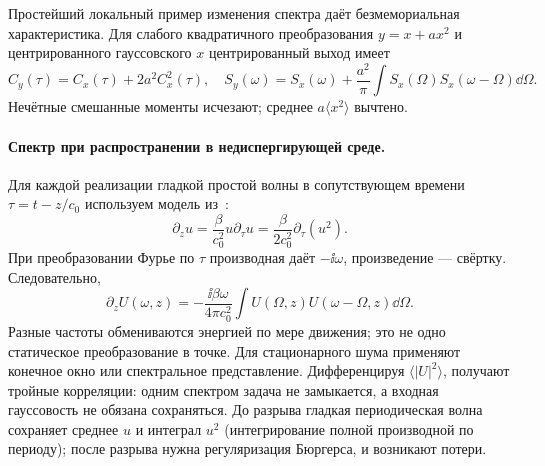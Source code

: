 Простейший локальный пример изменения спектра даёт безмемориальная характеристика. Для слабого квадратичного преобразования $y=x+ax^2$ и центрированного гауссовского $x$ центрированный выход имеет
\begin{equation}
 C_y(\tau)=C_x(\tau)+2a^2C_x^2(\tau),\quad
 S_y(\omega)=S_x(\omega)+\frac{a^2}{\pi}\int S_x(\Omega)S_x(\omega-\Omega)\dd\Omega.
\end{equation}
Нечётные смешанные моменты исчезают; среднее $a\langle x^2\rangle$ вычтено. \paragraph{Спектр при распространении в недиспергирующей среде.}
Для каждой реализации гладкой простой волны в сопутствующем времени $\tau=t-z/c_0$ используем модель из~:
\begin{equation}
 \partial_z u=\frac{\beta}{c_0^2}u\partial_\tau u
 =\frac{\beta}{2c_0^2}\partial_\tau(u^2).
\end{equation}
При преобразовании Фурье по $\tau$ производная даёт $-\ii\omega$, произведение --- свёртку. Следовательно,
\begin{equation}\label{eq:randomspectralevolution}
 \partial_zU(\omega,z)=-\frac{\ii\beta\omega}{4\pi c_0^2}
 \int U(\Omega,z)U(\omega-\Omega,z)\dd\Omega.
\end{equation}
Разные частоты обмениваются энергией по мере движения; это не одно статическое преобразование в точке. Для стационарного шума применяют конечное окно или спектральное представление. Дифференцируя $\langle|U|^2\rangle$, получают тройные корреляции: одним спектром задача не замыкается, а входная гауссовость не обязана сохраняться. До разрыва гладкая периодическая волна сохраняет среднее $u$ и интеграл $u^2$ (интегрирование полной производной по периоду); после разрыва нужна регуляризация Бюргерса, и возникают потери.
